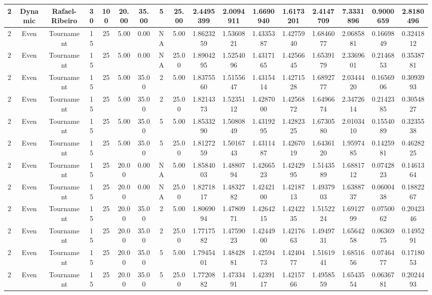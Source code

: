 \begin{longtable}{ | c | c | c | c | c | c | c | c | c | c | c | c | c | c | c | c | c | }
	\hline
	2	&	Dynamic	&	Rafael-Ribeiro	&	30	&	100	&	20.00	&	35.00	&	5	&	25.00	&	2.4495399	&	2.0094911	&	1.6690940	&	1.6173201	&	2.4147709	&	7.3331896	&	0.9000659	&	2.8180496 \\
	\hline
	2	&	Even	&	Tournament	&	15	&	25	&	5.00	&	0.00	&	NA	&	5.00	&	1.8623259	&	1.5360821	&	1.4335387	&	1.4275940	&	1.6846077	&	2.0685881	&	0.1669849	&	0.3241812 \\
	\hline
	2	&	Even	&	Tournament	&	15	&	25	&	5.00	&	0.00	&	NA	&	25.00	&	1.8904295	&	1.5254096	&	1.4317165	&	1.4256645	&	1.6539179	&	2.3369601	&	0.2146853	&	0.3538781 \\
	\hline
	2	&	Even	&	Tournament	&	15	&	25	&	5.00	&	35.00	&	2	&	5.00	&	1.8375560	&	1.5155647	&	1.4315414	&	1.4271528	&	1.6892777	&	2.0344420	&	0.1656906	&	0.3093993 \\
	\hline
	2	&	Even	&	Tournament	&	15	&	25	&	5.00	&	35.00	&	2	&	25.00	&	1.8214373	&	1.5235112	&	1.4287000	&	1.4256872	&	1.6496674	&	2.3472614	&	0.2142385	&	0.3054827 \\
	\hline
	2	&	Even	&	Tournament	&	15	&	25	&	5.00	&	35.00	&	5	&	5.00	&	1.8533290	&	1.5080849	&	1.4319295	&	1.4282325	&	1.6730580	&	2.0103410	&	0.1554089	&	0.3235538 \\
	\hline
	2	&	Even	&	Tournament	&	15	&	25	&	5.00	&	35.00	&	5	&	25.00	&	1.8127259	&	1.5016743	&	1.4311487	&	1.4267019	&	1.6436120	&	1.9597485	&	0.1425981	&	0.4628225 \\
	\hline
	2	&	Even	&	Tournament	&	15	&	25	&	20.00	&	0.00	&	NA	&	5.00	&	1.8584003	&	1.4880794	&	1.4266523	&	1.4242995	&	1.5143589	&	1.6881712	&	0.0742823	&	0.1461364 \\
	\hline
	2	&	Even	&	Tournament	&	15	&	25	&	20.00	&	0.00	&	NA	&	25.00	&	1.8271817	&	1.4832782	&	1.4242100	&	1.4218713	&	1.4937903	&	1.6388737	&	0.0600438	&	0.1882267 \\
	\hline
	2	&	Even	&	Tournament	&	15	&	25	&	20.00	&	35.00	&	2	&	5.00	&	1.8069094	&	1.4780971	&	1.4264215	&	1.4242235	&	1.5152224	&	1.6912799	&	0.0750062	&	0.2042346 \\
	\hline
	2	&	Even	&	Tournament	&	15	&	25	&	20.00	&	35.00	&	2	&	25.00	&	1.7717582	&	1.4759023	&	1.4244900	&	1.4217663	&	1.4949731	&	1.6564258	&	0.0636975	&	0.1495291 \\
	\hline
	2	&	Even	&	Tournament	&	15	&	25	&	20.00	&	35.00	&	5	&	5.00	&	1.7945401	&	1.4842881	&	1.4259473	&	1.4240477	&	1.5161941	&	1.6851656	&	0.0746477	&	0.1718053 \\
	\hline
	2	&	Even	&	Tournament	&	15	&	25	&	20.00	&	35.00	&	5	&	25.00	&	1.7720882	&	1.4733491	&	1.4239117	&	1.4215766	&	1.4958559	&	1.6543554	&	0.0636781	&	0.2024493 \\

\end{longtable}
